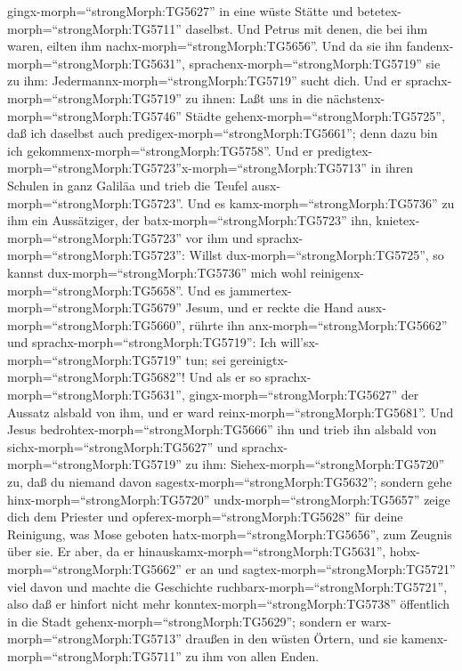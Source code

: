gingx-morph=``strongMorph:TG5627'' in eine wüste Stätte und
betetex-morph=``strongMorph:TG5711'' daselbst.  Und Petrus
mit denen, die bei ihm waren, eilten ihm
nachx-morph=``strongMorph:TG5656''.  Und da sie ihn
fandenx-morph=``strongMorph:TG5631'',
sprachenx-morph=``strongMorph:TG5719'' sie zu ihm:
Jedermannx-morph=``strongMorph:TG5719'' sucht dich.  Und er
sprachx-morph=``strongMorph:TG5719'' zu ihnen: Laßt uns in die
nächstenx-morph=``strongMorph:TG5746'' Städte
gehenx-morph=``strongMorph:TG5725'', daß ich daselbst auch
predigex-morph=``strongMorph:TG5661''; denn dazu bin ich
gekommenx-morph=``strongMorph:TG5758''.  Und er
predigtex-morph=``strongMorph:TG5723''x-morph=``strongMorph:TG5713'' in
ihren Schulen in ganz Galiläa und trieb die Teufel
ausx-morph=``strongMorph:TG5723''.  Und es
kamx-morph=``strongMorph:TG5736'' zu ihm ein Aussätziger, der
batx-morph=``strongMorph:TG5723'' ihn,
knietex-morph=``strongMorph:TG5723'' vor ihm und
sprachx-morph=``strongMorph:TG5723'': Willst
dux-morph=``strongMorph:TG5725'', so kannst
dux-morph=``strongMorph:TG5736'' mich wohl
reinigenx-morph=``strongMorph:TG5658''.  Und es
jammertex-morph=``strongMorph:TG5679'' Jesum, und er reckte die Hand
ausx-morph=``strongMorph:TG5660'', rührte ihn
anx-morph=``strongMorph:TG5662'' und
sprachx-morph=``strongMorph:TG5719'': Ich
will'sx-morph=``strongMorph:TG5719'' tun; sei
gereinigtx-morph=``strongMorph:TG5682''!  Und als er so
sprachx-morph=``strongMorph:TG5631'', gingx-morph=``strongMorph:TG5627''
der Aussatz alsbald von ihm, und er ward
reinx-morph=``strongMorph:TG5681''.  Und Jesus
bedrohtex-morph=``strongMorph:TG5666'' ihn und trieb ihn alsbald von
sichx-morph=``strongMorph:TG5627''  und
sprachx-morph=``strongMorph:TG5719'' zu ihm:
Siehex-morph=``strongMorph:TG5720'' zu, daß du niemand davon
sagestx-morph=``strongMorph:TG5632''; sondern gehe
hinx-morph=``strongMorph:TG5720'' undx-morph=``strongMorph:TG5657''
zeige dich dem Priester und opferex-morph=``strongMorph:TG5628'' für
deine Reinigung, was Mose geboten hatx-morph=``strongMorph:TG5656'', zum
Zeugnis über sie.  Er aber, da er
hinauskamx-morph=``strongMorph:TG5631'',
hobx-morph=``strongMorph:TG5662'' er an und
sagtex-morph=``strongMorph:TG5721'' viel davon und machte die Geschichte
ruchbarx-morph=``strongMorph:TG5721'', also daß er hinfort nicht mehr
konntex-morph=``strongMorph:TG5738'' öffentlich in die Stadt
gehenx-morph=``strongMorph:TG5629''; sondern er
warx-morph=``strongMorph:TG5713'' draußen in den wüsten Örtern, und sie
kamenx-morph=``strongMorph:TG5711'' zu ihm von allen Enden.

